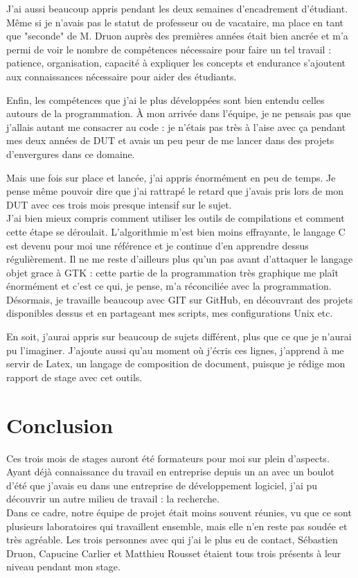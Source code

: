 \documentclass[11pt,french,a4paper]{report}
\begin{document}
J'ai aussi beaucoup appris pendant les deux semaines d'encadrement d'étudiant. Même si je n'avais pas le statut de professeur 
ou de vacataire, ma place en tant que "seconde" de M. Druon auprès des premières années était bien ancrée 
et m'a permi de voir le nombre de compétences nécessaire pour faire un tel travail : patience, organisation, 
capacité à expliquer les concepts et endurance s'ajoutent aux connaissances nécessaire pour aider des étudiants. 


Enfin, les compétences que j'ai le plus développées sont bien entendu celles autours de la programmation. 
À mon arrivée dans l'équipe, je ne pensais pas que j'allais autant me consacrer au code : je n'étais pas très à l'aise avec ça 
pendant mes deux années de DUT et avais un peu peur de me lancer dans des projets d'envergures dans ce domaine. 

Mais une fois sur place et lancée, j'ai appris énormément en peu de temps. Je pense même pouvoir dire que j'ai rattrapé le retard 
que j'avais pris lors de mon DUT avec ces trois mois presque intensif sur le sujet. \\

J'ai bien mieux compris comment utiliser les outils de compilations et comment cette étape se déroulait. L'algorithmie m'est bien moins
effrayante, le langage C est devenu pour moi une référence et je continue d'en apprendre dessus régulièrement. 
Il ne me reste d'ailleurs plus qu'un pas avant d'attaquer le langage objet grace à GTK : cette partie de la programmation très graphique
me plaît énormément et c'est ce qui, je pense, m'a réconciliée avec la programmation. \\

Désormais, je travaille beaucoup avec GIT sur GitHub, en découvrant des projets disponibles dessus et en partageant mes scripts,
mes configurations Unix etc. 

En soit, j'aurai appris sur beaucoup de sujets différent, plus que ce que je n'aurai pu l'imaginer.
J'ajoute aussi qu'au moment où j'écris ces lignes, j'apprend à me servir de Latex, un langage de composition de document, 
puisque je rédige mon rapport de stage avec cet outils. 


\chapter{Conclusion}

Ces trois mois de stages auront été formateurs pour moi sur plein d'aspects. Ayant déjà connaissance du travail en entreprise depuis un an
avec un boulot d'été que j'avais eu dans une entreprise de développement logiciel, j'ai pu découvrir un autre milieu de travail : 
la recherche. \\
Dans ce cadre, notre équipe de projet était moins souvent réunies, vu que ce sont plusieurs laboratoires qui travaillent ensemble, 
mais elle n'en reste pas soudée et très agréable. Les trois personnes avec qui j'ai le plus eu de contact, Sébastien Druon, 
Capucine Carlier et Matthieu Rousset étaient tous trois présents à leur niveau pendant mon stage.  \\
\end{document}
